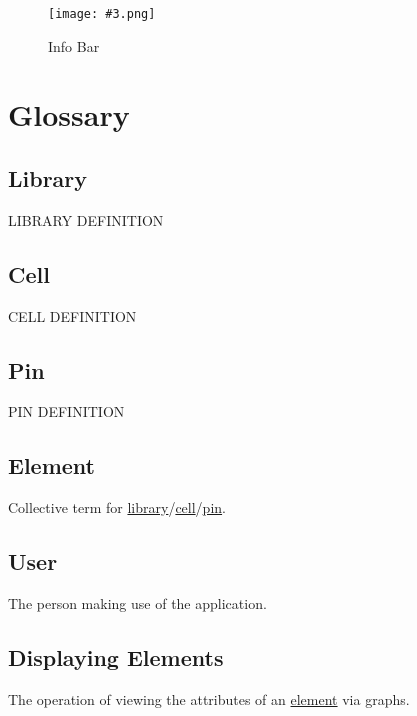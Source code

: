 \documentclass[10pt,a4paper]{report}
\newcommand{\refer}[2]{\hyperref[#1]{\textcolor{col:reference}{#2}}}
\newcommand{\defg}[3]{\label{glo:#1}\section{#2}#3\\}
\newcommand{\refg}[2]{\refer{glo:#1}{#2}}
\newcommand{\includeimage}[5]{
    \begin{figure}[H]
        #1
        \texttt{[image: \#3.png]}
        \caption{#4}
        \label{fig:#5}
    \end{figure}
}
\begin{document}
\includeimage{}{0.4}{Info Bar}{Info Bar}{info_bar}

\chapter{Glossary}
\defg{library}{Library}{
    LIBRARY DEFINITION
}
\defg{cell}{Cell}{
    CELL DEFINITION
}
\defg{pin}{Pin}{
    PIN DEFINITION
}
\defg{element}{Element}{
    Collective term for \refg{library}{library}/\refg{cell}{cell}/\refg{pin}{pin}.
}
\defg{user}{User}{
    The person making use of the application.
}
\defg{display_element}{Displaying Elements}{
    The operation of viewing the attributes of an \refg{element}{element} via graphs.
}
\end{document}
